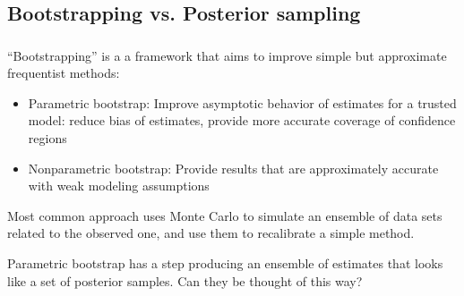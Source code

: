 \documentclass[c, dvipsnames]{beamer}  %
\begin{document}
\subsection{Bootstrapping vs. Posterior sampling}

\begin{frame}[shrink=5]
\frametitle{\insertsection} 
\framesubtitle{\insertsubsection}

“Bootstrapping” is a a framework that aims to improve simple but approximate frequentist methods:

\begin{itemize}
	\item Parametric bootstrap: Improve asymptotic behavior of
estimates for a trusted model: reduce bias of estimates,
provide more accurate coverage of confidence regions

\item Nonparametric bootstrap: Provide results that are
approximately accurate with weak modeling assumptions

\end{itemize}

Most common approach uses Monte Carlo to simulate an ensemble
of data sets related to the observed one, and use them to
recalibrate a simple method.

Parametric bootstrap has a step producing an ensemble of
estimates that looks like a set of posterior samples. Can they be
thought of this way?

\end{frame}
\end{document}
